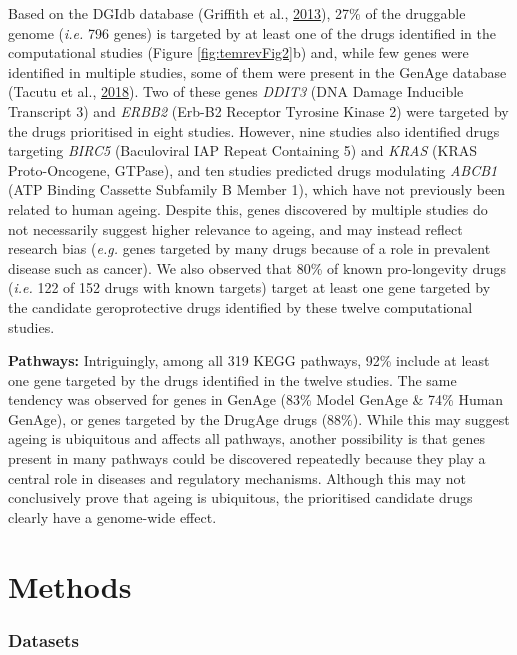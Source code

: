 \documentclass[12pt,twoside]{unicam}
\begin{document}
Based on the DGIdb database (Griffith et al., \protect\hyperlink{ref-Griffith2013}{2013}), 27\% of the druggable genome (\emph{i.e.} 796 genes) is targeted by at least one of the drugs identified in the computational studies (Figure \ref{fig:temrevFig2}b) and, while few genes were identified in multiple studies, some of them were present in the GenAge database (Tacutu et al., \protect\hyperlink{ref-Tacutu2018}{2018}). Two of these genes \emph{DDIT3} (DNA Damage Inducible Transcript 3) and \emph{ERBB2} (Erb-B2 Receptor Tyrosine Kinase 2) were targeted by the drugs prioritised in eight studies. However, nine studies also identified drugs targeting \emph{BIRC5} (Baculoviral IAP Repeat Containing 5) and \emph{KRAS} (KRAS Proto-Oncogene, GTPase), and ten studies predicted drugs modulating \emph{ABCB1} (ATP Binding Cassette Subfamily B Member 1), which have not previously been related to human ageing. Despite this, genes discovered by multiple studies do not necessarily suggest higher relevance to ageing, and may instead reflect research bias (\emph{e.g.} genes targeted by many drugs because of a role in prevalent disease such as cancer). We also observed that 80\% of known pro-longevity drugs (\emph{i.e.} 122 of 152 drugs with known targets) target at least one gene targeted by the candidate geroprotective drugs identified by these twelve computational studies.

\textbf{Pathways:} Intriguingly, among all 319 KEGG pathways, 92\% include at least one gene targeted by the drugs identified in the twelve studies. The same tendency was observed for genes in GenAge (83\% Model GenAge \& 74\% Human GenAge), or genes targeted by the DrugAge drugs (88\%). While this may suggest ageing is ubiquitous and affects all pathways, another possibility is that genes present in many pathways could be discovered repeatedly because they play a central role in diseases and regulatory mechanisms. Although this may not conclusively prove that ageing is ubiquitous, the prioritised candidate drugs clearly have a genome-wide effect.

\hypertarget{methods-1}{%
\section{Methods}\label{methods-1}}

\hypertarget{datasets}{%
\subsubsection{Datasets}\label{datasets}}
\end{document}
